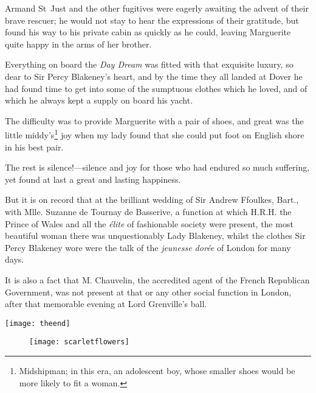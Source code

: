Armand St~Just and the other fugitives were eagerly awaiting the advent of their brave rescuer; he would not stay to hear the expressions of their gratitude, but found his way to his private cabin as quickly as he could, leaving Marguerite quite happy in the arms of her brother.

Everything on board the \textit{Day Dream} was fitted with that exquisite luxury, so dear to Sir Percy Blakeney's heart, and by the time they all landed at Dover he had found time to get into some of the sumptuous clothes which he loved, and of which he always kept a supply on board his yacht.

The difficulty was to provide Marguerite with a pair of shoes, and great was the little middy's\footnote{Midshipman; in this era, an adolescent boy, whose smaller shoes would be more likely to fit a woman.} joy when my lady found that she could put foot on English shore in his best pair.

The rest is silence!---silence and joy for those who had endured so much suffering, yet found at last a great and lasting happiness.

But it is on record that at the brilliant wedding of Sir Andrew Ffoulkes, Bart., with Mlle. Suzanne de Tournay de Basserive, a function at which H.R.H. the Prince of Wales and all the \textit{élite} of fashionable society were present, the most beautiful woman there was unquestionably Lady Blakeney, whilst the clothes Sir Percy Blakeney wore were the talk of the \textit{jeunesse dorée} of London for many days.

It is also a fact that M. Chauvelin, the accredited agent of the French Republican Government, was not present at that or any other social function in London, after that memorable evening at Lord Grenville's ball.

\centering
\texttt{[image: theend]}
\clearpage
\vfill
\begin{figure}[p!]
\centering
\texttt{[image: scarletflowers]}
\label{flowers}
\end{figure}
\vfill
\thispagestyle{empty}
\clearpage
